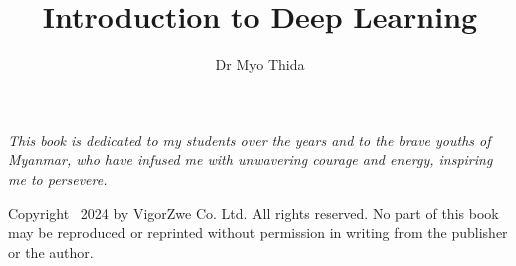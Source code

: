 \documentclass[oneside,11pt]{memoir} %
\title{Introduction to Deep Learning} %
\author{Dr Myo Thida} %
\begin{document}

\thispagestyle{empty} %

\newpage %

\newpage
\vspace*{5cm}
\thispagestyle{empty}
\begin{center}
   \emph{This book is dedicated to my students over the years and to the brave youths of Myanmar, who have infused me with unwavering courage and energy, inspiring me to persevere.}
\end{center}

\newpage

\vspace*{\fill}
\small
Copyright \textcopyright\ 2024 by VigorZwe Co. Ltd. All rights reserved.
No part of this book may be reproduced or reprinted without permission in writing from the publisher or the author.
\newpage


\tableofcontents %















\end{document}
